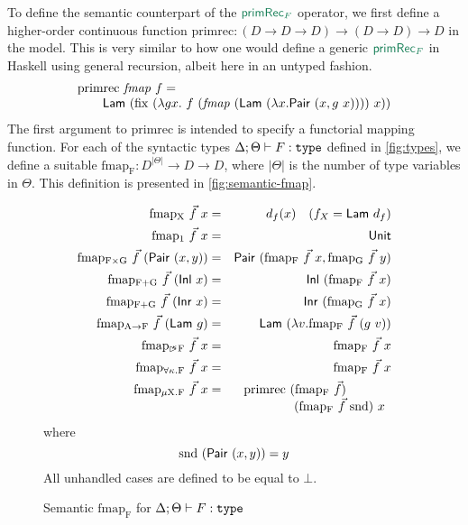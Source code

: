 To define the semantic counterpart of the $\elim{primRec$_F$}$
operator, we first define a higher-order continuous function
$\mathrm{primrec} : (D \to D \to D) \to (D \to D) \to D$ in the
model. This is very similar to how one would define a generic
$\elim{primRec$_F$}$ in Haskell using general recursion, albeit here
in an untyped fashion.
\begin{displaymath}
  \begin{array}{l}
    \mathrm{primrec}\ \mathit{fmap}\ f = \\
    \quad\quad\semCons{Lam}\ (\mathrm{fix}\ (\lambda g x.\ f\ (\mathit{fmap}\ (\semCons{Lam}\ (\lambda x. \semCons{Pair}\ (x, g\ x))))\ x))
  \end{array}
\end{displaymath}
The first argument to $\mathrm{primrec}$ is intended to specify a
functorial mapping function. For each of the syntactic types $\Delta;
\Theta \vdash F : \texttt{\textup{type}}$ defined in \autoref{fig:types}, we define
a suitable $\mathrm{fmap_F} : D^{|\Theta|} \to D \to D$, where
$|\Theta|$ is the number of type variables in $\Theta$. This
definition is presented in \autoref{fig:semantic-fmap}.

\begin{figure}[t]
  \begin{eqnarray*}
    \mathrm{fmap_X}\ \vec{f}\ x & = & d_f(x)\quad (f_X = \semCons{Lam}\ d_f) \\
    \mathrm{fmap_1}\ \vec{f}\ x & = & \semCons{Unit} \\
    \mathrm{fmap_{F \times G}}\ \vec{f}\ (\semCons{Pair}\ (x,y)) & = & \semCons{Pair}\ (\mathrm{fmap_F}\ \vec{f}\ x, \mathrm{fmap_G}\ \vec{f}\ y) \\
    \mathrm{fmap_{F + G}}\ \vec{f}\ (\semCons{Inl}\ x) & = & \semCons{Inl}\ (\mathrm{fmap_F}\ \vec{f}\ x) \\
    \mathrm{fmap_{F + G}}\ \vec{f}\ (\semCons{Inr}\ x) & = & \semCons{Inr}\ (\mathrm{fmap_G}\ \vec{f}\ x) \\
    \mathrm{fmap_{A \to F}}\ \vec{f}\ (\semCons{Lam}\ g) & = & \semCons{Lam}\ (\lambda v. \mathrm{fmap_F}\ \vec{f}\ (g\ v)) \\
    \mathrm{fmap_{\delay\kappa F}}\ \vec{f}\ x & = & \mathrm{fmap_F}\ \vec{f}\ x \\
    \mathrm{fmap_{\forall\kappa.F}}\ \vec{f}\ x & = & \mathrm{fmap_F}\ \vec{f}\ x \\
    \mathrm{fmap_{\mu X. F}}\ \vec{f}\ x & = &
    \begin{array}[t]{@{}l}
      \mathrm{primrec}\ (\mathrm{fmap_F}\ \vec{f})\ \\
      \quad\quad\quad\quad(\mathrm{fmap_F}\ \vec{f}\ \mathrm{snd})\ x
    \end{array}
  \end{eqnarray*}
  where
  \begin{displaymath}
    \mathrm{snd}\ (\semCons{Pair}\ (x,y)) = y
  \end{displaymath}
  All unhandled cases are defined to be equal to $\bot$.
  \caption{Semantic $\mathrm{fmap_F}$ for $\Delta; \Theta \vdash F : \texttt{\textup{type}}$}
  \label{fig:semantic-fmap}
\end{figure}

